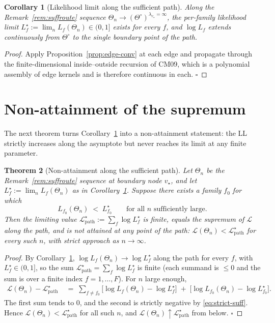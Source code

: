 \documentclass[11pt]{article}
\newcommand{\dup}{\lambda}             %
\newcommand{\Ll}{\mathcal{L}}
\newtheorem{theorem}{Theorem}
\newtheorem{corollary}[theorem]{Corollary}
\theoremstyle{definition}
\begin{document}
\begin{corollary}[Likelihood limit along the sufficient path]
\label{cor:LL-sup-attain}
Along the Remark~\ref{rem:suffroute} sequence
$\Theta_n \to (\Theta^\circ)^{\dup_{v_\star} = \infty}$, the
per-family likelihood limit $L^\star_f := \lim_n L_f(\Theta_n) \in (0,1]$
exists for every $f$, and $\log L_f$ extends continuously from
$\Theta^\circ$ to the single boundary point of the path.
\end{corollary}
\begin{proof}
Apply Proposition~\ref{prop:edge-conv} at each edge and propagate
through the finite-dimensional inside--outside recursion of CM09,
which is a polynomial assembly of edge kernels and is therefore
continuous in each. $\square$
\end{proof}

\section{Non-attainment of the supremum}
\label{sec:nonattain}

The next theorem turns Corollary~\ref{cor:LL-sup-attain} into a
non-attainment statement: the LL strictly increases along the
asymptote but never reaches its limit at any finite parameter.

\begin{theorem}[Non-attainment along the sufficient path]
\label{thm:unbounded}
Let $\Theta_n$ be the Remark~\ref{rem:suffroute} sequence at boundary
node $v_\star$, and let $L^\star_f := \lim_n L_f(\Theta_n)$ as in
Corollary~\ref{cor:LL-sup-attain}. Suppose there exists a family
$f_0$ for which
\begin{equation}
L_{f_0}(\Theta_n) \;<\; L^\star_{f_0}
\qquad \text{for all } n \text{ sufficiently large.}
\label{eq:strict-suff}
\end{equation}
Then the limiting value
$\Ll^\star_{\mathrm{path}} := \sum_f \log L^\star_f$ is finite,
equals the supremum of $\Ll$ along the path, and is not attained at
any point of the path: $\Ll(\Theta_n) < \Ll^\star_{\mathrm{path}}$
for every such $n$, with strict approach as $n\to\infty$.
\end{theorem}
\begin{proof}
By Corollary~\ref{cor:LL-sup-attain},
$\log L_f(\Theta_n) \to \log L^\star_f$ along the path for every $f$,
with $L^\star_f \in (0, 1]$, so the sum
$\Ll^\star_{\mathrm{path}} = \sum_f \log L^\star_f$ is finite (each
summand is $\le 0$ and the sum is over a finite index $f=1,\ldots,F$).
For $n$ large enough,
\begin{align*}
\Ll(\Theta_n) - \Ll^\star_{\mathrm{path}}
&\;=\; \sum_{f \neq f_0}\bigl[\log L_f(\Theta_n) - \log L^\star_f\bigr]
\;+\; \bigl[\log L_{f_0}(\Theta_n) - \log L^\star_{f_0}\bigr].
\end{align*}
The first sum tends to $0$, and the second is strictly negative by
\eqref{eq:strict-suff}. Hence
$\Ll(\Theta_n) < \Ll^\star_{\mathrm{path}}$ for all such $n$, and
$\Ll(\Theta_n) \uparrow \Ll^\star_{\mathrm{path}}$ from below.
$\square$
\end{proof}
\end{document}
